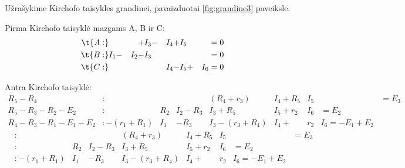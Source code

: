 \begin{exmp}
  Užrašykime Kirchofo taisykles grandinei, pavaizduotai
  \ref{fig:grandine3} paveiksle.

  Pirma Kirchofo taisyklė mazgams A, B ir C:
  \begin{align*}
    \t{A:}&  & + &I_{3} - &I_{4} + &I_{5} & &= 0 \\
    \t{B:} &I_{1} - &I_{2} - &I_{3} &&& &= 0\\
    \t{C:} &&&  &I_{4} - &I_{5} + &I_{6} &= 0
  \end{align*}

  Antra Kirchofo taisyklė:
  \begin{align*}
    R_{5}-R_{4}&: &&& (R_{4} + r_{3}) &I_{4} + R_{5}&I_{5} & &= E_{3} \\
    R_{5}-R_{3}-R_{2}-E_{2}&:
      & R_{2} &I_{2} - R_{3}&I_{3} + R_{5} &I_{5} + r_{2} &I_{6} &= E_{2} \\
    R_{4}-R_{3}-R_{1}-E_{1}-E_{2}&:
      -(r_{1} + R_{1}) &I_{1} & - R_{3} &I_{3} -
      (r_{3} + R_{4})&I_{4} + &r_{2} &I_{6} = -E_{1} + E_{2}
  \end{align*}
  \begin{align*}
    &:                  &             &              &        (R_{4} + r_{3}) &I_{4}  + R_{5}&I_{5} & &= E_{3} \\
    &:                  &       R_{2} &I_{2}  - R_{3}&I_{3}                           + R_{5}&I_{5} + r_{2} &I_{6} &= E_{2} \\
    &: -(r_{1} + R_{1}) &I_{1}        &       - R_{3}&I_{3} - (r_{3} + R_{4})&I_{4} + &r_{2} &I_{6} = -E_{1} + E_{2}
  \end{align*}

  
\end{exmp}
